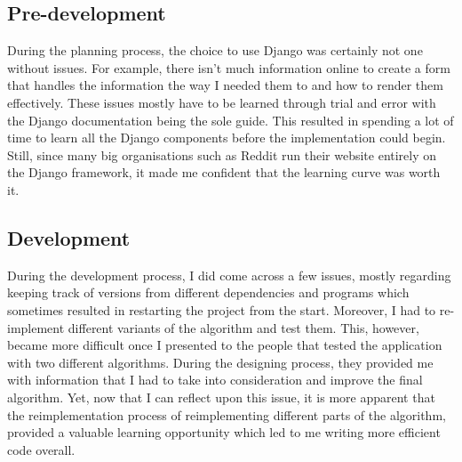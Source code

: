 \subsection{Pre-development}
During the planning process, the choice to use Django was certainly not one without issues. For example, there isn't much information online to create a form that handles the information the way I needed them to and how to render them effectively. These issues mostly have to be learned through trial and error with the Django documentation being the sole guide. This resulted in spending a lot of time to learn all the Django components before the implementation could begin. Still, since many big organisations such as Reddit run their website entirely on the Django framework, it made me confident that the learning curve was worth it.

\subsection{Development}
During the development process, I did come across a few issues, mostly regarding keeping track of versions from different dependencies and programs which sometimes resulted in restarting the project from the start. Moreover, I had to re-implement different variants of the algorithm and test them. This, however, became more difficult once I presented to the people that tested the application with two different algorithms. During the designing process, they provided me with information that I had to take into consideration and improve the final algorithm. Yet, now that I can reflect upon this issue, it is more apparent that the reimplementation process of reimplementing different parts of the algorithm, provided a valuable learning opportunity which led to me writing more efficient code overall.
